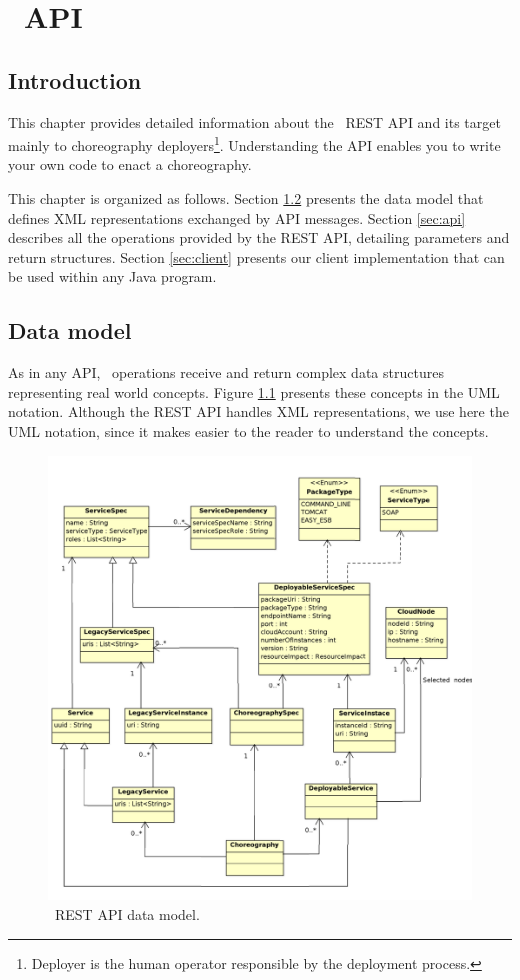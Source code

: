 
\chapter{\ee\ API}
\label{chap:rest-api}

\section{Introduction}

This chapter provides detailed information about the \ee\ REST API and its target mainly to choreography deployers\footnote{Deployer is the human operator responsible by the deployment process.}.
Understanding the API enables you to write your own code to enact a choreography. 

This chapter is organized as follows. Section \ref{sec:model} presents the data model that defines XML representations exchanged by API messages. Section \ref{sec:api} describes all the operations provided by the REST API, detailing parameters and return structures. Section \ref{sec:client} presents our client implementation that can be used within any Java program.

\section{Data model}
\label{sec:model}

As in any API, \ee\ operations receive and return complex data structures representing real world concepts. 
Figure \ref{img:data_model} presents these concepts in the UML notation.
Although the REST API handles XML representations, we use here the UML notation, since it makes easier to the reader to understand the concepts.

\begin{figure}
\centering
\includegraphics[scale=0.8]{img/data_model.pdf}
\caption{\ee\ REST API data model.}
\label{img:data_model}
\end{figure}


